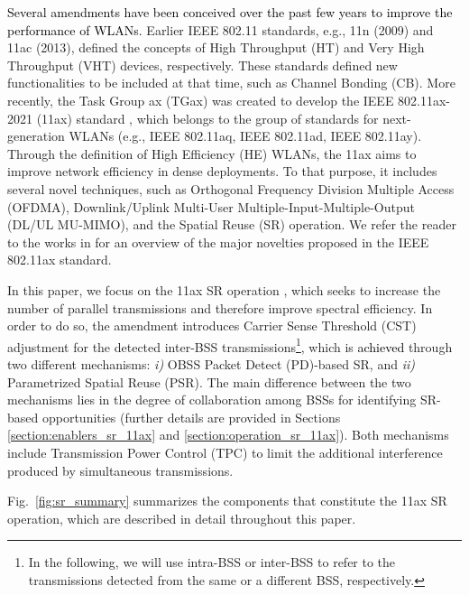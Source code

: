 \documentclass{ieeeaccess}
\begin{document}
\textcolor{black}{Several amendments have been conceived over the past few years to improve the performance of WLANs.} Earlier IEEE 802.11 standards, e.g., 11n (2009) and 11ac (2013), defined the concepts of High Throughput (HT) and Very High Throughput (VHT) devices, respectively. These standards defined new functionalities to be included at that time, such as Channel Bonding (CB). More recently, the Task Group ax (TGax) was created to develop the IEEE 802.11ax-2021 (11ax) standard \cite{tgax2019draft}, which belongs to the group of standards for next-generation WLANs (e.g., IEEE 802.11aq, IEEE 802.11ad, IEEE 802.11ay). Through the definition of High Efficiency (HE) WLANs, the 11ax aims to improve network efficiency in dense deployments. To that purpose, it includes several novel techniques, such as Orthogonal Frequency Division Multiple Access (OFDMA), Downlink/Uplink Multi-User Multiple-Input-Multiple-Output (DL/UL MU-MIMO), and the Spatial Reuse (SR) operation. We refer the reader to the works in \cite{bellalta2016ieee, afaqui2016ieee, qu2018survey, khorov2018tutorial} for an overview of the major novelties proposed in the IEEE 802.11ax standard.

In this paper, we focus on the 11ax SR operation \cite{merlin2009methods}, which seeks to increase the number of parallel transmissions and therefore improve spectral efficiency. In order to do so, the amendment introduces Carrier Sense Threshold (CST) adjustment for the detected inter-BSS transmissions\footnote{In the following, we will use intra-BSS or inter-BSS to refer to the transmissions detected from the same or a different BSS, respectively.}, which is \textcolor{black}{achieved} through two different mechanisms: \emph{i)} OBSS Packet Detect (PD)-based SR, and \emph{ii)} Parametrized Spatial Reuse (PSR). The main difference between the two mechanisms lies in the degree of collaboration among BSSs for identifying SR-based opportunities (further details are provided in Sections \ref{section:enablers_sr_11ax} and \ref{section:operation_sr_11ax}). Both mechanisms include Transmission Power Control (TPC) to limit the additional interference produced by simultaneous transmissions. 

Fig.~\ref{fig:sr_summary} summarizes the components that constitute the 11ax SR operation, which are described in detail throughout this paper.
\end{document}
